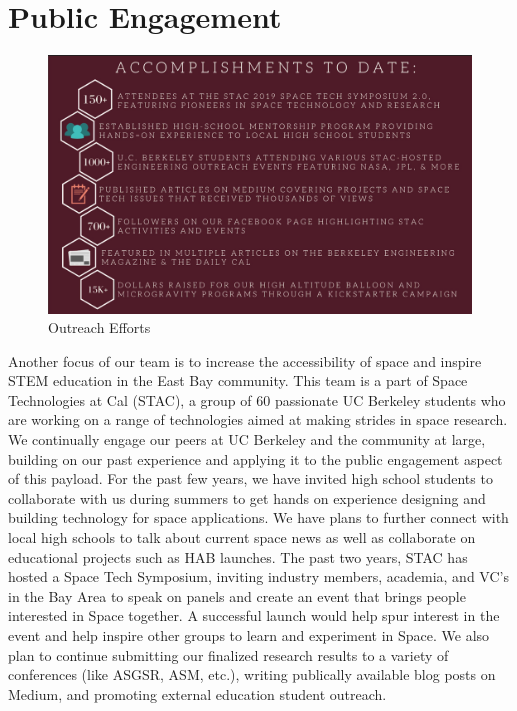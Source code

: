 \documentclass[twocolumn]{article}
\begin{document}
\section{Public Engagement}
\begin{figure}[h]
    \centering
    \includegraphics[scale = 0.28]{images/outreach.jpg}
    \caption{Outreach Efforts}
    \label{fig:my_label}
\end{figure}
Another focus of our team is to increase the accessibility of space and inspire STEM education in the East Bay community. This team is a part of Space Technologies at Cal (STAC), a group of 60 passionate UC Berkeley students who are working on a range of technologies aimed at making strides in space research. We continually engage our peers at UC Berkeley and the community at large, building on our past experience and applying it to the public engagement aspect of this payload. For the past few years, we have invited high school students to collaborate with us during summers to get hands on experience designing and building technology for space applications. We have plans to further connect with local high schools to talk about current space news as well as collaborate on educational projects such as HAB launches. The past two years, STAC has hosted a Space Tech Symposium, inviting industry members, academia, and VC’s in the Bay Area to speak on panels and create an event that brings people interested in Space together. A successful launch would help spur interest in the event and help inspire other groups to learn and experiment in Space. We also plan to continue submitting our finalized research results to a variety of conferences (like ASGSR, ASM, etc.), writing publically available blog posts on Medium, and promoting external education student outreach.
\end{document}
